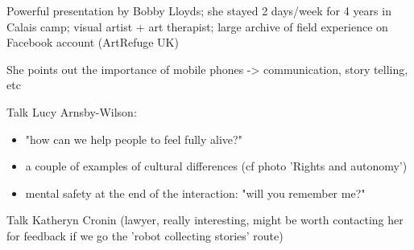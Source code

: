 \documentclass[]{article}
\begin{document}
Powerful presentation by Bobby Lloyds; she stayed 2 days/week for 4 years in
Calais camp; visual artist + art therapist; large archive of field experience on
Facebook account (ArtRefuge UK)

She points out the importance of mobile phones -> communication, story telling,
etc

Talk Lucy Arnsby-Wilson:

\begin{itemize}
    \item "how can we help people to feel fully alive?"
    \item a couple of examples of cultural differences (cf photo 'Rights and
        autonomy')
    \item mental safety at the end of the interaction: "will you remember me?"
\end{itemize}

Talk Katheryn Cronin (lawyer, really interesting, might be worth contacting her
for feedback if we go the 'robot collecting stories' route)
\end{document}
